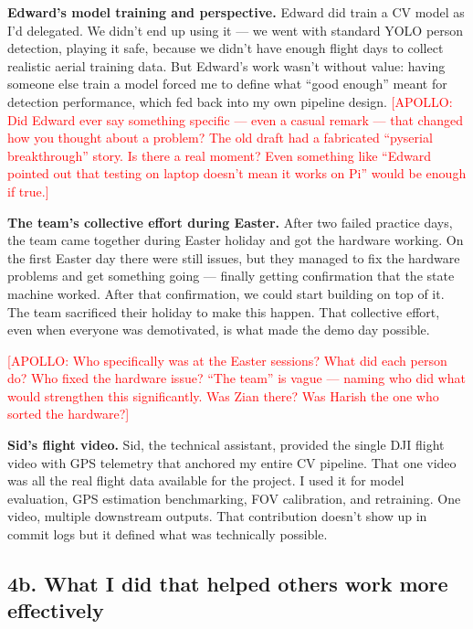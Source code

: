 \textbf{Edward's model training and perspective.} Edward did train a CV model as I'd delegated. We didn't end up using it --- we went with standard YOLO person detection, playing it safe, because we didn't have enough flight days to collect realistic aerial training data. But Edward's work wasn't without value: having someone else train a model forced me to define what ``good enough'' meant for detection performance, which fed back into my own pipeline design. \textcolor{red}{[APOLLO: Did Edward ever say something specific --- even a casual remark --- that changed how you thought about a problem? The old draft had a fabricated ``pyserial breakthrough'' story. Is there a real moment? Even something like ``Edward pointed out that testing on laptop doesn't mean it works on Pi'' would be enough if true.]}

\textbf{The team's collective effort during Easter.} After two failed practice days, the team came together during Easter holiday and got the hardware working. On the first Easter day there were still issues, but they managed to fix the hardware problems and get something going --- finally getting confirmation that the state machine worked. After that confirmation, we could start building on top of it. The team sacrificed their holiday to make this happen. That collective effort, even when everyone was demotivated, is what made the demo day possible.

\textcolor{red}{[APOLLO: Who specifically was at the Easter sessions? What did each person do? Who fixed the hardware issue? ``The team'' is vague --- naming who did what would strengthen this significantly. Was Zian there? Was Harish the one who sorted the hardware?]}

\textbf{Sid's flight video.} Sid, the technical assistant, provided the single DJI flight video with GPS telemetry that anchored my entire CV pipeline. That one video was all the real flight data available for the project. I used it for model evaluation, GPS estimation benchmarking, FOV calibration, and retraining. One video, multiple downstream outputs. That contribution doesn't show up in commit logs but it defined what was technically possible.


\subsection{4b. What I did that helped others work more effectively}

